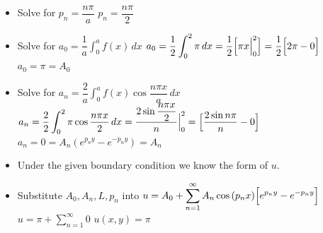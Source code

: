 \documentclass[10pt]{article}
\begin{document}
\begin{itemize}
    \item Solve for $ p_{n} =\dfrac{n\pi}{a} $
    \subitem  $ p_{n} =\dfrac{n\pi}{2} $
    \item Solve for $ \displaystyle a_{0} =\dfrac{1}{a} \int_{0}^{a} f(x) \,dx $
    \subitem $ \displaystyle a_{0} =\dfrac{1}{2} \int_{0}^{2} \pi \,dx = \dfrac{1}{2} \Bigl[ \pi x \Big|_{0}^{2} \Bigr] = \dfrac{1}{2} \Bigl[ 2\pi - 0\Bigr] $
    \subitem $ a_{0} = \pi = A_{0} $
    \item Solve for $ \displaystyle a_{n} =\dfrac{2}{a} \int_{0}^{a} f(x)\cos{\dfrac{n\pi x}{a}} \,dx $
    \subitem $ \displaystyle a_{n} = \dfrac{2}{2} \int_{0}^{2} \pi\cos{\dfrac{n\pi x}{2}} \,dx = \dfrac{2\sin{\dfrac{n\pi x}{2}}}{n} \Big|_{0}^{2} = \Bigl[ \dfrac{2\sin{n\pi}}{n} - 0 \Bigr] $
    \subitem $ \displaystyle a_{n} = 0 = A_{n}(e^{p_{n}y} - e^{-p_{n}y}) = A_{n} $
    \item Under the given boundary condition we know the form of $ u $.
    \item Substitute $ A_{0}, A_{n}, L, p_{n} $ into $ \displaystyle u =  A_{0} + \sum_{n = 1}^{\infty} A_{n}\cos{(p_{n}x)}\Bigl[ e^{p_{n}y} - e^{-p_{n}y} \Bigr] $
    \subitem $ \displaystyle u =  \pi + \sum_{n = 1}^{\infty} 0 $
    \subitem $ \displaystyle u(x,y) =  \pi  $
\end{itemize}

\newpage
\end{document}
